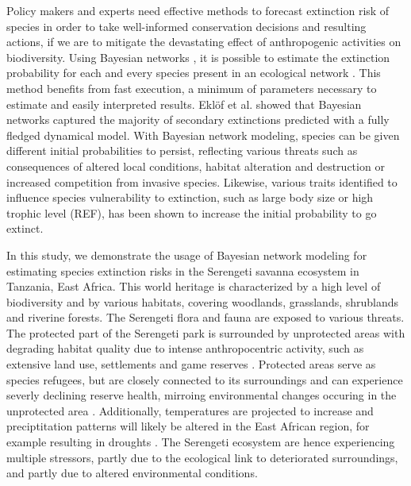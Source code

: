 \documentclass[a4paper,11pt]{article}
\begin{document}
Policy makers and experts need effective methods to forecast extinction risk of species in order to take well-informed conservation decisions and resulting actions, if we are to mitigate the devastating effect of anthropogenic activities on biodiversity. Using Bayesian networks \cite{Jensen1996}, it is possible to estimate the extinction probability for each and every species present in an ecological network \citep{Eklofetal2013}. This method benefits from fast execution, a minimum of parameters necessary to estimate and easily interpreted results. Ekl\"{o}f et al. \citep{Eklofetal2013} showed that Bayesian networks captured the majority of secondary extinctions predicted with a fully fledged dynamical model. With Bayesian network modeling, species can be given different initial probabilities to persist, reflecting various threats such as consequences of altered local conditions, habitat alteration and destruction or increased competition from invasive species. Likewise, various traits identified to influence species vulnerability to extinction, such as large body size or high trophic level (REF), has been shown to increase the initial probability to go extinct. 

In this study, we demonstrate the usage of Bayesian network modeling for estimating species extinction risks in the Serengeti savanna ecosystem in Tanzania, East Africa. This world heritage is characterized by a high level of biodiversity and by various habitats, covering woodlands, grasslands, shrublands and riverine forests. The Serengeti flora and fauna are exposed to various threats. The protected part of the Serengeti park is surrounded by unprotected areas with degrading habitat quality due to intense anthropocentric activity, such as extensive land use, settlements and game reserves \cite{Mligo2015}. Protected areas serve as species refugees, but are closely connected to its surroundings and can experience severly declining reserve health, mirroing environmental changes occuring in the unprotected area \cite{Lauranceetal2012, Gastonetal2008}.  Additionally, temperatures are projected to increase and preciptitation patterns will likely be altered in the East African region, for example resulting in droughts \cite{Funketal2006, Niangetal2014}. The Serengeti ecosystem are hence experiencing multiple stressors, partly due to the ecological link to deteriorated surroundings, and partly due to altered environmental conditions. 
\end{document}
